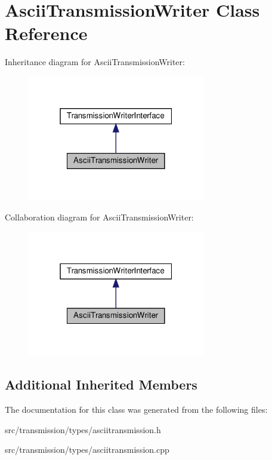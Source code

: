 \hypertarget{classAsciiTransmissionWriter}{}\section{Ascii\+Transmission\+Writer Class Reference}
\label{classAsciiTransmissionWriter}


Inheritance diagram for Ascii\+Transmission\+Writer\+:
\nopagebreak
\begin{figure}[H]
\begin{center}
\leavevmode
\includegraphics[width=220pt]{classAsciiTransmissionWriter__inherit__graph}
\end{center}
\end{figure}


Collaboration diagram for Ascii\+Transmission\+Writer\+:
\nopagebreak
\begin{figure}[H]
\begin{center}
\leavevmode
\includegraphics[width=220pt]{classAsciiTransmissionWriter__coll__graph}
\end{center}
\end{figure}
\subsection*{Additional Inherited Members}


The documentation for this class was generated from the following files\+:\begin{DoxyCompactItemize}
\item 
src/transmission/types/asciitransmission.\+h\item 
src/transmission/types/asciitransmission.\+cpp\end{DoxyCompactItemize}
